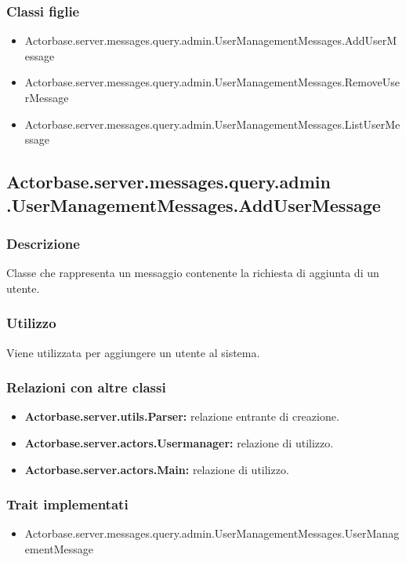 \documentclass[a4paper]{article}
\begin{document}
			\subsubsection{Classi figlie}
				\begin{itemize}
					\item Actorbase.server.messages.query.admin.UserManagementMessages.AddUserMessage
					\item Actorbase.server.messages.query.admin.UserManagementMessages.RemoveUserMessage
					\item Actorbase.server.messages.query.admin.UserManagementMessages.ListUserMessage
				\end{itemize}
			
		\subsection{Actorbase.server.messages.query.admin \newline
		.UserManagementMessages.AddUserMessage}
			\subsubsection{Descrizione}
				Classe che rappresenta un messaggio contenente la richiesta di aggiunta di un utente.
				
			\subsubsection{Utilizzo}
				Viene utilizzata per aggiungere un utente al sistema.
				
			\subsubsection{Relazioni con altre classi}
				\begin{itemize}
					\item \textbf{Actorbase.server.utils.Parser:} relazione entrante di creazione.
					\item \textbf{Actorbase.server.actors.Usermanager:} relazione di utilizzo.
					\item \textbf{Actorbase.server.actors.Main:} relazione di utilizzo.
				\end{itemize}
			\subsubsection{Trait implementati}
				\begin{itemize}
					\item Actorbase.server.messages.query.admin.UserManagementMessages.UserManagementMessage
				\end{itemize}
		
\end{document}
